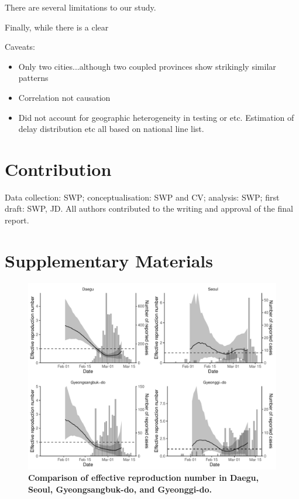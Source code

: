 \documentclass[12pt]{article}
\begin{document}
There are several limitations to our study.

Finally, while there is a clear 

Caveats:
\begin{itemize}
  \item Only two cities...although two coupled provinces show strikingly similar patterns
  \item Correlation not causation
  \item Did not account for geographic heterogeneity in testing or etc. Estimation of delay distribution etc all based on national line list.
\end{itemize}

\section*{Contribution}

Data collection: SWP; conceptualisation: SWP and CV; analysis: SWP; first draft: SWP, JD. All authors contributed to the writing and approval of the final report.

\pagebreak



\section{Supplementary Materials}

\begin{figure}[!ht]
\includegraphics[width=\textwidth]{figure_R_t_all.pdf}
\caption{
\textbf{Comparison of effective reproduction number in Daegu, Seoul, Gyeongsangbuk-do, and Gyeonggi-do.}
}
\end{figure}
\end{document}
